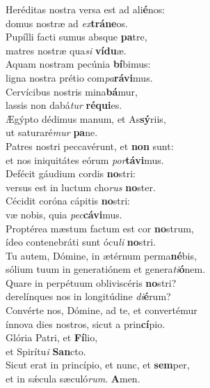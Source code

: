 \evenverse Heréditas nostra versa est ad ali\textbf{é}nos:~\*\\
\evenverse domus nostræ ad \textit{ex}\textbf{trá}\textbf{ne}os.\\
\oddverse Pupílli facti sumus absque \textbf{pa}tre,~\*\\
\oddverse matres nostræ qua\textit{si} \textbf{ví}\textbf{du}æ.\\
\evenverse Aquam nostram pecúnia \textbf{bí}bimus:~\*\\
\evenverse ligna nostra prétio com\textit{pa}\textbf{rá}\textbf{vi}mus.\\
\oddverse Cervícibus nostris mina\textbf{bá}mur,~\*\\
\oddverse lassis non dabá\textit{tur} \textbf{ré}\textbf{qui}es.\\
\evenverse Ægýpto dédimus manum, et As\textbf{sý}riis,~\*\\
\evenverse ut saturaré\textit{mur} \textbf{pa}ne.\\
\oddverse Patres nostri peccavérunt, et \textbf{non} sunt:~\*\\
\oddverse et nos iniquitátes eórum \textit{por}\textbf{tá}\textbf{vi}mus.\\
\evenverse Defécit gáudium cordis \textbf{no}stri:~\*\\
\evenverse versus est in luctum cho\textit{rus} \textbf{no}ster.\\
\oddverse Cécidit coróna cápitis \textbf{no}stri:~\*\\
\oddverse væ nobis, quia \textit{pec}\textbf{cá}\textbf{vi}mus.\\
\evenverse Proptérea mæstum factum est cor \textbf{no}strum,~\*\\
\evenverse ídeo contenebráti sunt ócu\textit{li} \textbf{no}stri.\\
\oddverse Tu autem, Dómine, in ætérnum perma\textbf{né}bis,~\*\\
\oddverse sólium tuum in generatiónem et genera\textit{ti}\textbf{ó}nem.\\
\evenverse Quare in perpétuum obliviscéris \textbf{no}stri?~\*\\
\evenverse derelínques nos in longitúdine \textit{di}\textbf{é}rum?\\
\oddverse Convérte nos, Dómine, ad te, et convertémur~\*\\
\oddverse ínnova dies nostros, sicut a prin\textbf{cí}pio.\\
\evenverse Glória Patri, et \textbf{Fí}lio,~\*\\
\evenverse et Spirítu\textit{i} \textbf{San}cto.\\
\oddverse Sicut erat in princípio, et nunc, et \textbf{sem}per,~\*\\
\oddverse et in sǽcula sæculó\textit{rum}. \textbf{A}men.\\
